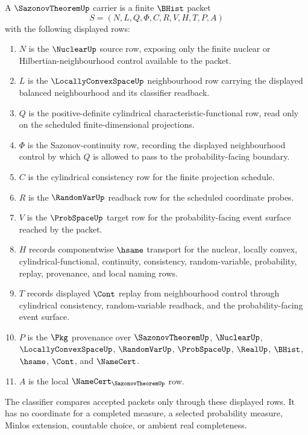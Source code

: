 \begin{definition}
\label{def:sazonov-theorem-carrier}
A $\SazonovTheoremUp$ carrier is a finite $\BHist$ packet
$$
S=(N,L,Q,\Phi,C,R,V,H,T,P,A)
$$
with the following displayed rows:
\begin{enumerate}
\item $N$ is the $\NuclearUp$ source row, exposing only the finite nuclear or Hilbertian-neighbourhood control available to the packet.
\item $L$ is the $\LocallyConvexSpaceUp$ neighbourhood row carrying the displayed balanced neighbourhood and its classifier readback.
\item $Q$ is the positive-definite cylindrical characteristic-functional row, read only on the scheduled finite-dimensional projections.
\item $\Phi$ is the Sazonov-continuity row, recording the displayed neighbourhood control by which $Q$ is allowed to pass to the probability-facing boundary.
\item $C$ is the cylindrical consistency row for the finite projection schedule.
\item $R$ is the $\RandomVarUp$ readback row for the scheduled coordinate probes.
\item $V$ is the $\ProbSpaceUp$ target row for the probability-facing event surface reached by the packet.
\item $H$ records componentwise $\hsame$ transport for the nuclear, locally convex, cylindrical-functional, continuity, consistency, random-variable, probability, replay, provenance, and local naming rows.
\item $T$ records displayed $\Cont$ replay from neighbourhood control through cylindrical consistency, random-variable readback, and the probability-facing event surface.
\item $P$ is the $\Pkg$ provenance over $\SazonovTheoremUp$, $\NuclearUp$, $\LocallyConvexSpaceUp$, $\RandomVarUp$, $\ProbSpaceUp$, $\RealUp$, $\BHist$, $\hsame$, $\Cont$, and $\NameCert$.
\item $A$ is the local $\NameCert_{\SazonovTheoremUp}$ row.
\end{enumerate}
The classifier compares accepted packets only through these displayed rows. It has no coordinate for a completed measure, a selected probability measure, Minlos extension, countable choice, or ambient real completeness.
\end{definition}

